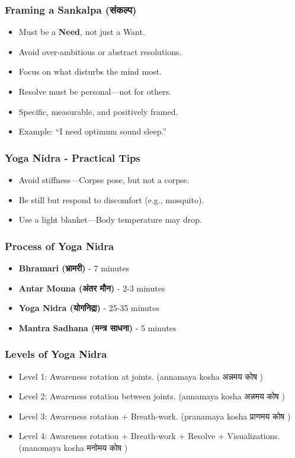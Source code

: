 \begin{frame}[fragile]\frametitle{Framing a Sankalpa (संकल्प)}
      \begin{itemize}
        \item Must be a \textbf{Need}, not just a Want.
        \item Avoid over-ambitious or abstract resolutions.
        \item Focus on what disturbs the mind most.
        \item Resolve must be personal—not for others.
        \item Specific, measurable, and positively framed.
        \item Example: “I need optimum sound sleep.”
      \end{itemize}
\end{frame}

\begin{frame}[fragile]\frametitle{Yoga Nidra - Practical Tips}
      \begin{itemize}
        \item Avoid stiffness—Corpse pose, but not a corpse.
        \item Be still but respond to discomfort (e.g., mosquito).
        \item Use a light blanket—Body temperature may drop.
      \end{itemize}
\end{frame}

\begin{frame}[fragile]\frametitle{Process of Yoga Nidra}
      \begin{itemize}
        \item \textbf{Bhramari (भ्रामरी)} - 7 minutes
        \item \textbf{Antar Mouna (अंतर मौन)} - 2-3 minutes
        \item \textbf{Yoga Nidra (योगनिद्रा)} - 25-35 minutes
        \item \textbf{Mantra Sadhana (मन्त्र साधना)} - 5 minutes
      \end{itemize}
\end{frame}

\begin{frame}[fragile]\frametitle{Levels of Yoga Nidra}
      \begin{itemize}
        \item Level 1: Awareness rotation at joints. (annamaya kosha अन्नमय कोष )
        \item Level 2: Awareness rotation between joints. (annamaya kosha अन्नमय कोष )
        \item Level 3: Awareness rotation + Breath-work. (pranamaya kosha प्राणमय कोष )
        \item Level 4: Awareness rotation + Breath-work + Resolve + Visualizations. (manomaya kosha मनोमय कोष )
      \end{itemize}
\end{frame}


